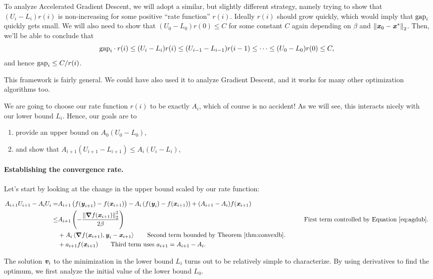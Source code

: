 To analyze Accelerated Gradient Descent, we will adopt a similar, but
slightly different strategy, namely trying to show that $(U_i - L_i) r(i)$
is non-increasing for some positive ``rate function'' $r(i)$. Ideally $r(i)$ should
grow quickly, which would imply that $\text{gap}_i$ quickly gets small.
We will also need to show that $(U_0 - L_0) r(0) \leq C$ for some constant
$C$ again depending on $\beta$ and $\left\| \boldsymbol{\mathit{x}}_0 - \boldsymbol{\mathit{x}}^* \right\|_2$.
%
Then, we'll be able to conclude that
\[
\text{gap}_i \cdot r(i) \leq (U_i - L_i) r(i) \leq (U_{i-1} - L_{i-1}) r(i-1) \leq
\cdots \leq (U_0 - L_0) r(0) \leq C,
\]
and hence $\text{gap}_i \leq C/r(i)$.

This framework is fairly general. We could have also used it to
analyze Gradient Descent, and it works for many other optimization
algorithms too.

We are going to choose our rate function $r(i)$ to be exactly $A_i$,
which of course is no accident!
As we will see, this interacts nicely with our lower
bound $L_i$.
Hence, our goals are to
\begin{enumerate}
\item provide an upper bound on $A_0 (U_0 - L_0)$,
\item and show that $A_{i+1} (U_{i+1} - L_{i+1})  \leq A_{i} (U_{i} - L_{i}) $,
\end{enumerate}

\paragraph{Establishing the convergence rate.}
Let's start by looking at the change in the upper bound scaled by our
rate function:

\begin{align}
  A_{i+1}U_{i+1} - A_i U_i
  =&
  A_{i+1}\left( f(\yy_{i+1}) - f(\xx_{i+1}) \right)
  -
  A_{i}\left( f(\yy_{i}) - f(\xx_{i+1}) \right)
  +
  (A_{i+1}-A_{i}) f(\xx_{i+1})
\\
\leq &
     A_{i+1}\left(
     - \frac{\norm{\grad  f(\xx_{i+1})}_2^2}{2\beta}
       \right)
       & \tag*{First term controlled by Equation~\eqref{eq:agdub}.}
  \\
  &+
     A_{i}
    \ip{\grad f(\xx_{i+1}), \yy_{i} - \xx_{i+1}  }
    \tag*{Second term bounded by Theorem~\ref{thm:convexlb}.}
  \\
   &+ a_{i+1} f(\xx_{i+1})
     \tag*{Third term uses $a_{i+1} = A_{i+1}-A_{i}$.}
\end{align}

The solution $\boldsymbol{\mathit{v}}_i$ to the minimization in the lower bound $L_i$
turns out to be relatively simple to characterize.
By using derivatives to find the optimum, we first analyze the initial
value of the lower bound $L_0$.

